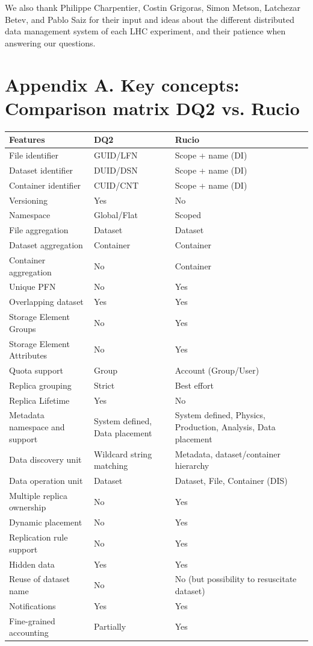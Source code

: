 \documentclass{atlasnote}
\begin{document}
We also thank Philippe Charpentier, Costin Grigoras, Simon Metson, Latchezar Betev, and Pablo Saiz for their input and ideas about the different distributed data management system of each LHC experiment, and their patience when answering our questions.

\newpage

\label{rucio:appendices}

\section*{Appendix A. Key concepts: Comparison matrix DQ2 vs. Rucio}
\label{Comparison_matrix:key-concepts-comparison-matrix-dq2-vs-rucio}
\begin{tabular}{l l p{5cm} }
\toprule
\textbf{
Features
} & \textbf{
DQ2
} & \textbf{
Rucio
}\\
\midrule
File identifier & GUID/LFN & Scope + name (DI) \\
Dataset identifier & DUID/DSN & Scope + name (DI) \\
Container identifier & CUID/CNT & Scope + name (DI) \\
Versioning & Yes & No \\
Namespace & Global/Flat & Scoped  \\
File aggregation & Dataset & Dataset  \\
Dataset aggregation & Container & Container  \\
Container aggregation & No  & Container  \\
Unique PFN & No & Yes \\
Overlapping dataset & Yes & Yes \\
Storage Element Groups & No & Yes \\
Storage Element Attributes & No & Yes \\
Quota support & Group & Account (Group/User) \\
Replica grouping & Strict & Best effort \\
Replica Lifetime & Yes & No \\
Metadata namespace and support & System defined, Data placement & System defined, Physics, Production, Analysis, Data placement \\
Data discovery unit & Wildcard string matching & Metadata, dataset/container hierarchy\\
Data operation unit &Dataset & Dataset, File, Container (DIS) \\
Multiple replica ownership & No & Yes \\
Dynamic placement & No & Yes \\
Replication rule support & No & Yes \\
Hidden data & Yes & Yes \\
Reuse of dataset name & No & No (but possibility to resuscitate dataset) \\
Notifications & Yes & Yes \\
Fine-grained accounting & Partially & Yes \\
\bottomrule
\end{tabular}
\end{document}
